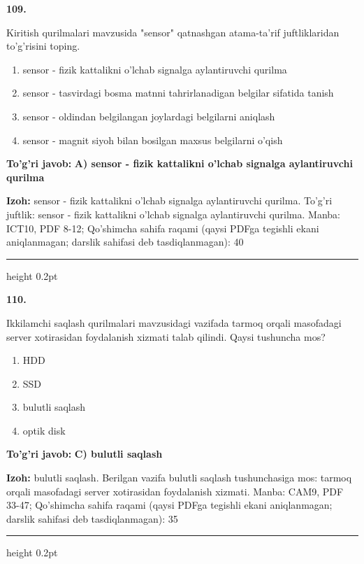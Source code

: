 \documentclass[10pt,a4paper]{article}
\begin{document}
{\bfseries\sffamily\color{ink} 109.}
\par
Kiritish qurilmalari mavzusida "sensor" qatnashgan atama-ta'rif juftliklaridan to'g'risini toping.
\begin{enumerate}[label=\Alph*),leftmargin=9mm]
\item sensor - fizik kattalikni o'lchab signalga aylantiruvchi qurilma
\item sensor - tasvirdagi bosma matnni tahrirlanadigan belgilar sifatida tanish
\item sensor - oldindan belgilangan joylardagi belgilarni aniqlash
\item sensor - magnit siyoh bilan bosilgan maxsus belgilarni o'qish
\end{enumerate}
\begin{tcolorbox}[enhanced,breakable,colback=teal!4,colframe=teal!60!black,boxrule=0.45pt,arc=1.2mm,left=2.7mm,right=2.7mm,top=1.8mm,bottom=1.8mm,before skip=2mm,after skip=2mm]
{\bfseries\sffamily\color{teal}To'g'ri javob:} \textbf{A) sensor - fizik kattalikni o'lchab signalga aylantiruvchi qurilma}
\par\smallskip
{\bfseries Izoh:} sensor - fizik kattalikni o'lchab signalga aylantiruvchi qurilma. To'g'ri juftlik: sensor - fizik kattalikni o'lchab signalga aylantiruvchi qurilma. Manba: ICT10, PDF 8-12; Qo'shimcha sahifa raqami (qaysi PDFga tegishli ekani aniqlanmagan; darslik sahifasi deb tasdiqlanmagan): 40
\end{tcolorbox}
\vspace{2mm}\hrule height 0.2pt\vspace{3mm}

{\bfseries\sffamily\color{ink} 110.}
\par
Ikkilamchi saqlash qurilmalari mavzusidagi vazifada tarmoq orqali masofadagi server xotirasidan foydalanish xizmati talab qilindi. Qaysi tushuncha mos?
\begin{enumerate}[label=\Alph*),leftmargin=9mm]
\item HDD
\item SSD
\item bulutli saqlash
\item optik disk
\end{enumerate}
\begin{tcolorbox}[enhanced,breakable,colback=teal!4,colframe=teal!60!black,boxrule=0.45pt,arc=1.2mm,left=2.7mm,right=2.7mm,top=1.8mm,bottom=1.8mm,before skip=2mm,after skip=2mm]
{\bfseries\sffamily\color{teal}To'g'ri javob:} \textbf{C) bulutli saqlash}
\par\smallskip
{\bfseries Izoh:} bulutli saqlash. Berilgan vazifa bulutli saqlash tushunchasiga mos: tarmoq orqali masofadagi server xotirasidan foydalanish xizmati. Manba: CAM9, PDF 33-47; Qo'shimcha sahifa raqami (qaysi PDFga tegishli ekani aniqlanmagan; darslik sahifasi deb tasdiqlanmagan): 35
\end{tcolorbox}
\vspace{2mm}\hrule height 0.2pt\vspace{3mm}
\end{document}
